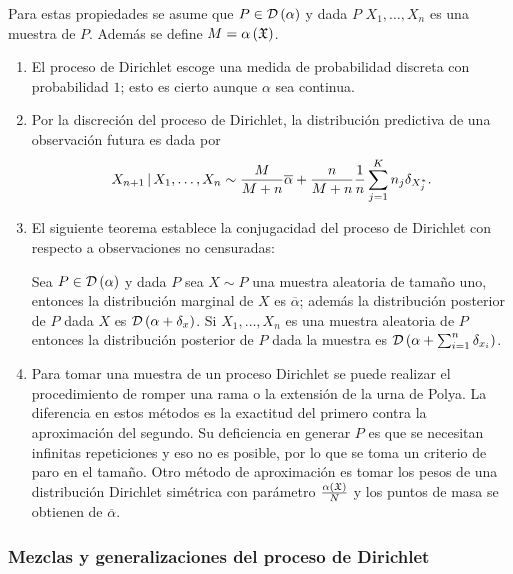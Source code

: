 Para estas propiedades se asume que $P \in \mathcal{D}\left( \alpha \right)$ y dada $P$ $X_{1}, \ldots, X_{n}$ es una muestra de $P$. Además %
se define $M = \alpha\left( \mathfrak{X} \right)$.
\begin{enumerate}
    \item El proceso de Dirichlet escoge una medida de probabilidad discreta con probabilidad $1$; esto es cierto aunque %
    $\alpha$ sea continua.
    \item Por la discreción del proceso de Dirichlet, la distribución predictiva de una observación futura es dada por %
    \begin{equation} \label{eq:actualpd}
    X_{n+1} \,|\, X_{1}, \ldots, X_{n} \sim \frac{M}{M + n}\overline{\alpha} + \frac{n}{M + n} \frac{1}{n} \sum_{j = 1}^{%
    K} n_{j} \delta_{X_{j}^{*}}.
    \end{equation}
    \item El siguiente teorema establece la conjugacidad del proceso de Dirichlet con respecto a observaciones no %
    censuradas:
    \begin{teor}[Ferguson]
    Sea $P \in \mathcal{D}\left( \alpha \right)$ y dada $P$ sea $X \sim P$ una muestra aleatoria de tamaño uno, entonces la distribución %
    marginal de $X$ es $\overline{\alpha}$; además la distribución posterior de $P$ dada $X$ es $\D\Pp{\alpha + %
    \delta_{x}}$. Si $X_{1}, \ldots, X_{n}$ es una muestra aleatoria de $P$ entonces la distribución posterior de $P$ %
    dada la muestra es $\mathcal{D}\left( \alpha + \sum_{i = 1}^{n} \delta_{x_{i}} \right)$.
    \end{teor}
    \item Para tomar una muestra de un proceso Dirichlet se puede realizar el procedimiento de romper una rama o la %
    extensión de la urna de Polya. La diferencia en estos métodos es la exactitud del primero contra la aproximación %
    del segundo. Su deficiencia en generar $P$ es que se necesitan infinitas repeticiones y eso no es posible, por lo %
    que se toma un criterio de paro en el tamaño. Otro método de aproximación es tomar los pesos de una distribución %
    Dirichlet simétrica con parámetro $\frac{\alpha\left( \mathfrak{X} \right)}{N}$ y los puntos de masa se obtienen de $\overline{\alpha}$.
\end{enumerate}


\subsubsection{Mezclas y generalizaciones del proceso de Dirichlet}


